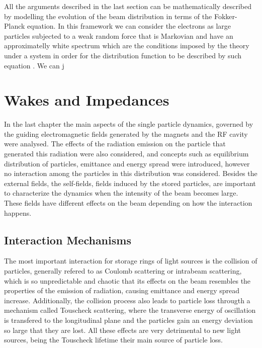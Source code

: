 	All the arguments described in the last section can be mathematically described by modelling the evolution of the beam distribution in terms of the Fokker-Planck equation. In this framework we can consider the electrons as large particles subjected to a weak random force that is Markovian and have an approximatelly white spectrum which are the conditions imposed by the theory under a system in order for the distribution function to be described by such equation \cite{landau, Wang1945, zwanzig}. We can j


\chapter{Wakes and Impedances}\label{cap:wake_impedances}

    In the last chapter the main aspects of the single particle dynamics, governed by the guiding electromagnetic fields generated by the magnets and the RF cavity were analysed. The effects of the radiation emission on the particle that generated this radiation were also considered, and concepts such as equilibrium distribution of particles, emittance and energy spread were introduced, however no interaction among the particles in this distribution was considered. Besides the external fields, the self-fields, fields induced by the stored particles, are important to characterize the dynamics when the intensity of the beam becomes large. These fields have different effects on the beam depending on how the interaction happens.

\section{Interaction Mechanisms}

    The most important interaction for storage rings of light sources is the collision of particles, generally refered to as Coulomb scattering or intrabeam scattering, which is so unpredictable and chaotic that its effects on the beam resembles the properties of the emission of radiation, causing emittance and energy spread increase. Additionally, the collision process also leads to particle loss througth a mechanism called Touscheck scattering, where the transverse energy of oscillation is transfered to the longitudinal plane and the particles gain an energy deviation so large that they are lost. All these effects are very detrimental to new light sources, being the Touscheck lifetime their main source of particle loss.


